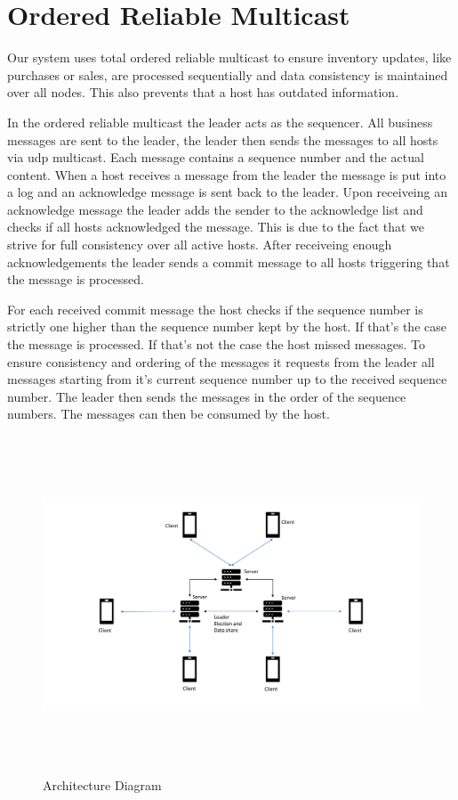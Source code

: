 \section{Ordered Reliable Multicast}\label{sec:OrderedReliableMulticast}
Our system uses total ordered reliable multicast to ensure inventory updates, like purchases or sales, are processed sequentially and data consistency is maintained over all nodes. This also prevents that a host has outdated information. 

In the ordered reliable multicast the leader acts as the sequencer. All business messages are sent to the leader, the leader then sends the messages to all hosts via udp multicast. Each message contains a sequence number and the actual content. When a host receives a message from the leader the message is put into a log and an acknowledge message is sent back to the leader. Upon receiveing an acknowledge message the leader adds the sender to the acknowledge list and checks if all hosts acknowledged the message. This is due to the fact that we strive for full consistency over all active hosts. After receiveing enough acknowledgements the leader sends a commit message to all hosts triggering that the message is processed. 

For each received commit message the host checks if the sequence number is strictly one higher than the sequence number kept by the host. 
If that's the case the message is processed.
If that's not the case the host missed messages. To ensure consistency and ordering of the messages it requests from the leader all messages starting from it's current sequence number up to the received sequence number. The leader then sends the messages in the order of the sequence numbers. The messages can then be consumed by the host. 




\begin{figure}[h!]
        \includegraphics[height=10cm, width=18cm]{images/Architecture.png}
        \caption{Architecture Diagram}
        \label{fig:architecture}
\end{figure}
